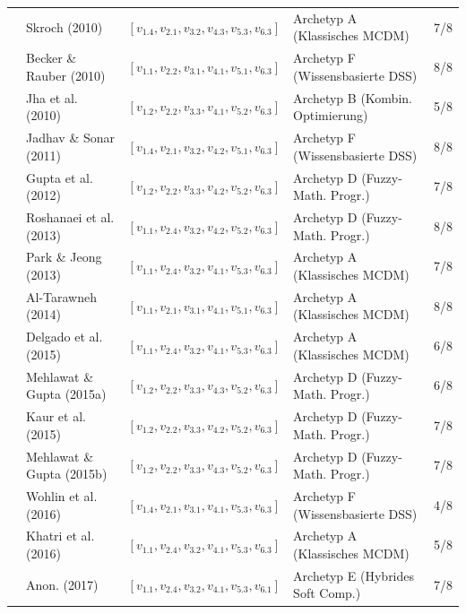 \begin{longtable}{p{} p{} p{} p{} p{}}
\cite{WBGP3ETU} & Skroch (2010) & $[v_{1.4}, v_{2.1}, v_{3.2}, v_{4.3}, v_{5.3}, v_{6.3}]$ & Archetyp A (Klassisches MCDM) & 7/8 \\
\cite{8VHUMEKY} & Becker \& Rauber (2010) & $[v_{1.1}, v_{2.2}, v_{3.1}, v_{4.1}, v_{5.1}, v_{6.3}]$ & Archetyp F (Wissensbasierte DSS) & 8/8 \\
\cite{VUVLUN85} & Jha et al. (2010) & $[v_{1.2}, v_{2.2}, v_{3.3}, v_{4.1}, v_{5.2}, v_{6.3}]$ & Archetyp B (Kombin. Optimierung) & 5/8 \\
\cite{U4E7VXQU} & Jadhav \& Sonar (2011) & $[v_{1.4}, v_{2.1}, v_{3.2}, v_{4.2}, v_{5.1}, v_{6.3}]$ & Archetyp F (Wissensbasierte DSS) & 8/8 \\
\cite{6YJHIVHG} & Gupta et al. (2012) & $[v_{1.2}, v_{2.2}, v_{3.3}, v_{4.2}, v_{5.2}, v_{6.3}]$ & Archetyp D (Fuzzy-Math. Progr.) & 7/8 \\
\cite{VRTXHQI7} & Roshanaei et al. (2013) & $[v_{1.1}, v_{2.4}, v_{3.2}, v_{4.2}, v_{5.2}, v_{6.3}]$ & Archetyp D (Fuzzy-Math. Progr.) & 8/8 \\
\cite{W8P543Y2} & Park \& Jeong (2013) & $[v_{1.1}, v_{2.4}, v_{3.2}, v_{4.1}, v_{5.3}, v_{6.3}]$ & Archetyp A (Klassisches MCDM) & 7/8 \\
\cite{WZM7DUBY} & Al-Tarawneh (2014) & $[v_{1.1}, v_{2.1}, v_{3.1}, v_{4.1}, v_{5.1}, v_{6.3}]$ & Archetyp A (Klassisches MCDM) & 8/8 \\
\cite{LYMHTPXS} & Delgado et al. (2015) & $[v_{1.1}, v_{2.4}, v_{3.2}, v_{4.1}, v_{5.3}, v_{6.3}]$ & Archetyp A (Klassisches MCDM) & 6/8 \\
\cite{JX4RDRDU} & Mehlawat \& Gupta (2015a) & $[v_{1.2}, v_{2.2}, v_{3.3}, v_{4.3}, v_{5.2}, v_{6.3}]$ & Archetyp D (Fuzzy-Math. Progr.) & 6/8 \\
\cite{P9SATBH5} & Kaur et al. (2015) & $[v_{1.2}, v_{2.2}, v_{3.3}, v_{4.2}, v_{5.2}, v_{6.3}]$ & Archetyp D (Fuzzy-Math. Progr.) & 7/8 \\
\cite{B7ZTQCZZ} & Mehlawat \& Gupta (2015b) & $[v_{1.2}, v_{2.2}, v_{3.3}, v_{4.3}, v_{5.2}, v_{6.3}]$ & Archetyp D (Fuzzy-Math. Progr.) & 7/8 \\
\cite{JT5X3FIG} & Wohlin et al. (2016) & $[v_{1.4}, v_{2.1}, v_{3.1}, v_{4.1}, v_{5.3}, v_{6.3}]$ & Archetyp F (Wissensbasierte DSS) & 4/8 \\
\cite{DFASRUVC} & Khatri et al. (2016) & $[v_{1.1}, v_{2.4}, v_{3.2}, v_{4.1}, v_{5.3}, v_{6.3}]$ & Archetyp A (Klassisches MCDM) & 5/8 \\
\cite{QNWK8SAP} & Anon. (2017) & $[v_{1.1}, v_{2.4}, v_{3.2}, v_{4.1}, v_{5.3}, v_{6.1}]$ & Archetyp E (Hybrides Soft Comp.) & 7/8 \\

\end{longtable}
